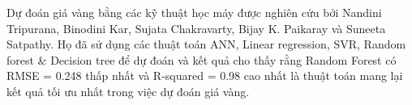 Dự đoán giá vàng bằng các kỹ thuật học máy được nghiên cứu bởi Nandini Tripurana, Binodini Kar, Sujata Chakravarty, Bijay K. Paikaray và Suneeta Satpathy\cite{in1}. Họ đã sử dụng các thuật toán ANN, Linear regression, SVR, Random forest \& Decision tree để dự đoán và kết quả cho thấy rằng Random Forest có RMSE = 0.248 thấp nhất và R-squared = 0.98  cao nhất là thuật toán mang lại kết quả tối ưu nhất trong việc dự đoán giá vàng.